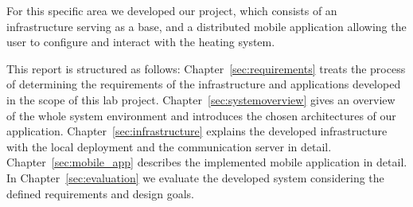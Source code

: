For this specific area we developed our project, which consists of an infrastructure serving as a base, and a distributed mobile application allowing the user to configure and interact with the heating system.

This report is structured as follows:
Chapter~\ref{sec:requirements} treats the process of determining the requirements of the infrastructure and applications developed in the scope of this lab project.
Chapter~\ref{sec:systemoverview} gives an overview of the whole system environment and introduces the chosen architectures of our application.
Chapter~\ref{sec:infrastructure} explains the developed infrastructure with the local deployment and the communication server in detail.
Chapter~\ref{sec:mobile_app} describes the implemented mobile application in detail.
In Chapter~\ref{sec:evaluation} we evaluate the developed system considering the defined requirements and design goals.



